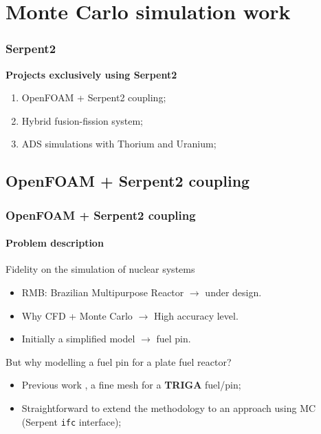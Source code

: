 \documentclass[svgnames,smaller,table]{beamer}
\begin{document}
\section{Monte Carlo simulation work}
\begin{frame}
  \frametitle{Serpent2}
  \textbf{Projects exclusively using Serpent2}
  \vspace{10px}
  \begin{enumerate}
    \item OpenFOAM + Serpent2 coupling;
    \item Hybrid fusion-fission system;
    \item ADS simulations with Thorium and Uranium;
    \end{enumerate}
\end{frame}

\subsection{OpenFOAM + Serpent2 coupling}
\begin{frame}
  \frametitle{OpenFOAM + Serpent2 coupling}
  \framesubtitle{Problem description}
  \begin{center}
    \alert{Fidelity on the simulation of nuclear systems}\\
    \vspace{10px}
    \begin{itemize}
    \item RMB: Brazilian Multipurpose Reactor $\rightarrow$ under design.
    \item Why CFD + Monte Carlo $\rightarrow$ High accuracy level.
    \item Initially a simplified model $\rightarrow$ fuel pin.
    \end{itemize}
    \vspace{10px}
    \alert{But why modelling a fuel pin for a plate fuel reactor?}
    \vspace{10px}
    \begin{itemize}
    \item Previous work \cite{Vasconcelos2018}, a fine mesh for a \textbf{TRIGA} fuel/pin;
    \item Straightforward to extend the methodology to an approach using MC (Serpent \texttt{ifc} interface);
    \end{itemize}
  \end{center}
\end{frame}
\end{document}
